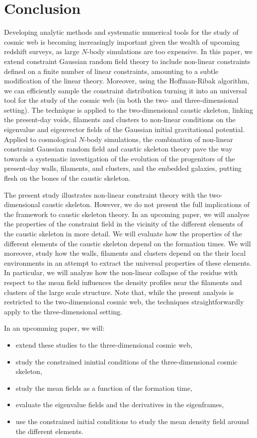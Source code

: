 \documentclass[a4paper, 11pt]{article}
\begin{document}
\section{Conclusion}\label{sec:conclusion}
Developing analytic methods and systematic numerical tools for the study of cosmic web is becoming increasingly important given the wealth of upcoming redshift surveys, as large $N$-body simulations are too expensive. In this paper, we extend constraint Gaussian random field theory to include non-linear constraints defined on a finite number of linear constraints, amounting to a subtle modification of the linear theory. Moreover, using the Hoffman-Ribak algorithm, we can efficiently sample the constraint distribution turning it into an universal tool for the study of the cosmic web (in both the two- and three-dimensional setting). The technique is applied to the two-dimensional caustic skeleton, linking the present-day voids, filaments and clusters to non-linear conditions on the eigenvalue and eigenvector fields of the Gaussian initial gravitational potential. Applied to cosmological $N$-body simulations, the combination of non-linear constraint Gaussian random field and caustic skeleton theory pave the way towards a systematic investigation of the evolution of the progenitors of the present-day walls, filaments, and clusters, and the embedded galaxies, putting flesh on the bones of the caustic skeleton. 

The present study illustrates non-linear constraint theory with the two-dimensional caustic skeleton. However, we do not present the full implications of the framework to caustic skeleton theory. In an upcoming paper, we will analyse the properties of the constraint field in the vicinity of the different elements of the caustic skeleton in more detail. We will evaluate how the properties of the different elements of the caustic skeleton depend on the formation times. We will moreover, study how the walls, filaments and clusters depend on the their local environments in an attempt to extract the universal properties of these elements. In particular, we will analyze how the non-linear collapse of the residue with respect to the mean field influences the density profiles near the filaments and clusters of the large scale structure. Note that, while the present analysis is restricted to the two-dimensional cosmic web, the techniques straightforwardly apply to the three-dimensional setting.

In an upcomming paper, we will:
\begin{itemize}
\item extend these studies to the three-dimensional cosmic web,
\item study the constrained inintial conditions of the three-dimensional cosmic skeleton,
\item study the mean fields as a function of the formation time,
\item evaluate the eigenvalue fields and the derivatives in the eigenframes,
\item use the constrained initial conditions to study the mean density field around the different elements.
\end{itemize}
\end{document}
